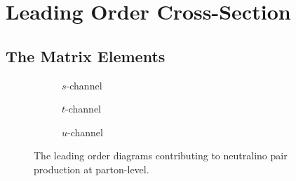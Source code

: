 \documentclass[../main.tex]{subfiles}
\begin{document}




    \section{Leading Order Cross-Section}

        \subsection{The Matrix Elements}
            \begin{figure} [ht!]
                \centering
                \begin{subfigure}{0.3\linewidth}
                    \centering
                    \caption{\(s\)-channel}
                \end{subfigure}
                \begin{subfigure}{0.3\linewidth}
                    \centering
                    \caption{\(t\)-channel}
                \end{subfigure}
                \begin{subfigure}{0.3\linewidth}
                    \centering
                    \caption{\(u\)-channel}
                \end{subfigure}
                \caption{The leading order diagrams contributing to neutralino pair production at parton-level.}
                \label{fig:tree_level_diagrams}
            \end{figure}
\end{document}
